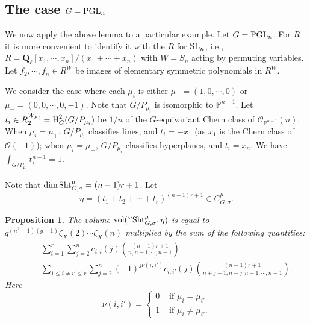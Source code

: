 \documentclass[reqno]{amsart}
\numberwithin{equation}{subsection}
\newtheorem{prop}[subsubsection]{Proposition}
\theoremstyle{definition}
\def\PP{\mathbb{P}}
\newcommand\cO{\mathcal{O}}
\newcommand\Sht{\textup{Sht}}
\newcommand{\vol}{\textup{vol}}
\newcommand\PGL{\textup{PGL}}
\newcommand\SL{\textup{SL}}
\newcommand\upH{\textup{H}}
\newcommand{\Qlbar}{\overline{\Q}_\ell}
\newcommand{\s}{\sigma}
\newcommand{\y}{\eta}
\newcommand{\z}{\zeta}
\newcommand{\om}{\omega}
\newcommand{\Q}{\mathbf{Q}}
\begin{document}
\subsection{The case $G=\PGL_n$} We now apply the above lemma to a particular example. Let $G=\PGL_n$. For $R$ it is more convenient to identify it with the $R$ for $\SL_n$, i.e., $R=\Qlbar[x_1,\cdots, x_n]/(x_1+\cdots+x_n)$ with $W=S_n$ acting by permuting variables. Let $f_2,\cdots, f_n\in R^W$ be images of elementary symmetric polynomials in $R^W$. 

We consider the case where each $\mu_i$ is either $\mu_+=(1,0,\cdots, 0)$ or $\mu_-=(0,0,\cdots, 0,-1)$. Note that $G/P_{\mu_i}$ is isomorphic to $\PP^{n-1}$. Let $t_i\in R^{W_{\mu_i}}_2=\upH^{2}_G(G/P_{\mu_i})$ be $1/n$ of the $G$-equivariant Chern class of 
$\cO_{\PP^{n-1}}(n)$. When $\mu_i=\mu_+$, $G/P_{\mu_i}$ classifies lines, and $t_i=-x_1$ (as $x_1$ is the Chern class of $\cO(-1)$); when $\mu_i=\mu_-$, $G/P_{\mu_i}$ classifies hyperplanes, and $t_i=x_n$. We have $\int_{G/P_{\mu_i}}t_i^{n-1}=1$.


Note that $\dim \Sht^\mu_{G,\s}=(n-1)r+1$. Let
\begin{equation*}
\y=(t_1+t_2+\cdots+t_r)^{(n-1)r+1}\in C^\mu_{G,\s}.
\end{equation*}


\begin{prop}\label{prop: vol PGL}
The volume $\vol({}^\om\Sht^\mu_{G,\s},\y)$ is equal to $q^{(n^2-1)(g-1)}\z_X(2)\cdots\z_X(n)$ multiplied by the sum of the following quantities:
\begin{eqnarray*}
    &&-\sum_{i=1}^r\sum_{j=2}^n c_{i,i}(j)\binom{(n-1)r+1}{n,n-1,\cdots, n-1} \\
    && -\sum_{1\le i\ne i'\le r}\sum_{j=2}^{n}(-1)^{j\nu(i,i')}c_{i,i'}(j)\binom{(n-1)r+1}{n+j-1,n-j,n-1,\cdots, n-1}.
\end{eqnarray*}
Here
\begin{equation*}
    \nu(i,i')=\begin{cases}
        0 & \mbox{ if } \mu_i=\mu_{i'}\\
        1 & \mbox{ if } \mu_i\ne\mu_{i'}.
    \end{cases}
\end{equation*}
\end{prop}
\end{document}
